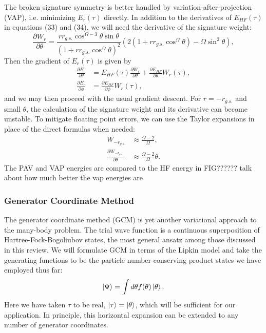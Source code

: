 \documentclass[prb,aps,twocolumn,showpacs,10pt]{revtex4-2}
\begin{document}
The broken signature symmetry is better handled by variation-after-projection (VAP), i.e. minimizing $E_r(\tau)$ directly. In addition to the derivatives of $E_{HF}(\tau)$ in equations (33) and (34), we will need the derivative of the signature weight:
\begin{equation}
\frac{\partial W_r}{\partial \theta} = \frac{r r_{g.s.} \cos^{\Omega-3} \theta \sin \theta}{(1+r r_{g.s.} \cos^\Omega \theta)^2}
 \left( 2(1+r r_{g.s.} \cos^\Omega \theta)-\Omega \sin^2\theta \right),
\end{equation}
Then the gradient of $E_r(\tau)$ is given by
\begin{align}
\frac{\partial E_r}{\partial \theta}&= E_{HF}(\tau) \frac{\partial W_r}{\partial \theta} + \frac{\partial E_{HF}}{\partial \theta} W_r(\tau),\\
\frac{\partial E_r}{\partial \phi}&=  \frac{\partial E_{HF}}{\partial \phi} W_r(\tau),
\end{align}
and we may then proceed with the usual gradient descent. For $r=-r_{g.s.}$ and small $\theta$, the calculation of the signature weight and its derivative can become unstable. To mitigate floating point errors, we can use the Taylor expansions in place of the direct formulas when needed:
\begin{align}
W_{-r_{g.s.}} &\approx \frac{\Omega-2}{\Omega},\\
\frac{\partial W_{-r_{g.s.}}}{\partial \theta}& \approx \frac{\Omega-2}{\Omega} \theta.
\end{align}
The PAV and VAP energies are compared to the HF energy in FIG??????
talk about how much better the vap energies are



\subsubsection{Generator Coordinate Method}

The generator coordinate method (GCM) is yet another variational approach to the many-body problem. The trial wave function is a continuous superposition of Hartree-Fock-Bogoliubov states, the most general ansatz among those discussed in this review. We will formulate GCM in terms of the Lipkin model and take the generating functions to be the particle number-conserving product states we have employed thus far:
\begin{equation}
\ket{\Psi} = \int d\theta f(\theta) \ket{\theta}.
\end{equation}
Here we have taken $\tau$ to be real,  $\ket{\tau} = \ket{\theta}$, which will be sufficient for our application. In principle, this horizontal expansion can be extended to any number of generator coordinates. 
\end{document}
